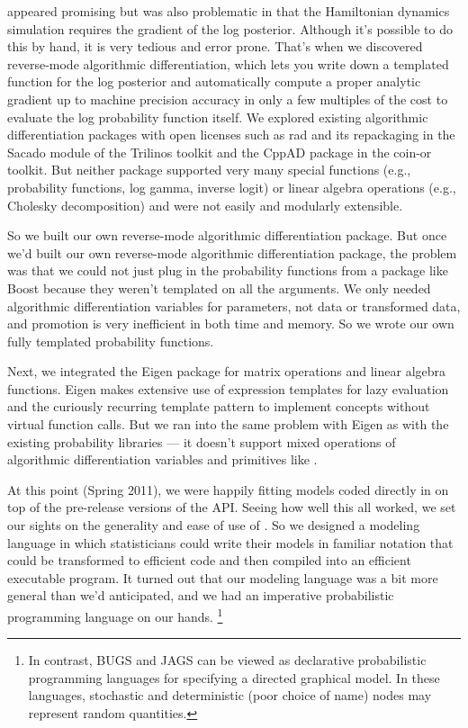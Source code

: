 \HMC appeared promising but was also problematic in that the
Hamiltonian dynamics simulation requires the gradient of the log
posterior.  Although it's possible to do this by hand, it is very
tedious and error prone.  That's when we discovered reverse-mode
algorithmic differentiation, which lets you write down a templated
\Cpp function for the log posterior and automatically compute a proper
analytic gradient up to machine precision accuracy in only a few
multiples of the cost to evaluate the log probability function itself.
We explored existing algorithmic differentiation packages with open
licenses such as {\sc rad} \citep{Gay:2005} and its repackaging in the
Sacado module of the Trilinos toolkit and the {\small CppAD} package in the
{\sc coin-or} toolkit.  But neither package supported very many
special functions (e.g., probability functions, log gamma, inverse logit) or
linear algebra operations (e.g., Cholesky decomposition) and were not
easily and modularly extensible.  

So we built our own reverse-mode algorithmic differentiation package.
But once we'd built our own reverse-mode algorithmic differentiation
package, the problem was that we could not just plug in the
probability functions from a package like Boost because they weren't
templated on all the arguments.  We only needed algorithmic
differentiation variables for parameters, not data or transformed
data, and promotion is very inefficient in both time and memory.  So
we wrote our own fully templated probability functions.  

Next, we integrated the Eigen \Cpp package for matrix operations and
linear algebra functions.  Eigen makes extensive use of expression
templates for lazy evaluation and the curiously recurring template
pattern to implement concepts without virtual function calls.  But we
ran into the same problem with Eigen as with the existing probability
libraries --- it doesn't support mixed operations of algorithmic
differentiation variables and primitives like .

At this point (Spring 2011), we were happily fitting models coded 
directly in \Cpp on top of the pre-release versions of the \Stan API. 
Seeing how well this all worked, we set our sights on the generality 
and ease of use of \BUGS.  So we designed a modeling language in which 
statisticians could write their models in familiar notation that could 
be transformed to efficient \Cpp code and then compiled into an 
efficient executable program.  It turned out that our modeling
language was a bit more general than we'd anticipated, and we had an
imperative probabilistic programming language on our hands.%
%
\footnote{In contrast, BUGS and JAGS can be viewed as declarative
  probabilistic programming languages for specifying a directed
  graphical model.  In these languages, stochastic and deterministic
  (poor choice of name) nodes may represent random quantities.}
 
